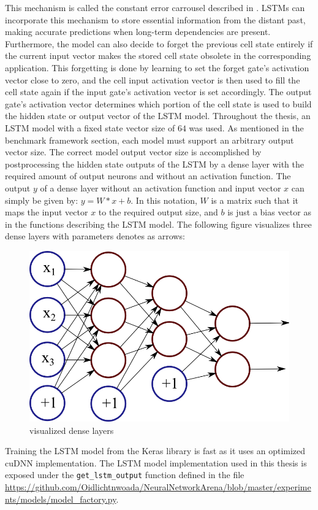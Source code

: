 \documentclass[draft,final]{vutinfth} %
\begin{document}
    This mechanism is called the constant error carrousel described in \cite[p. 7]{LSTM}.
    LSTMs can incorporate this mechanism to store essential information from the distant past, making accurate predictions when long-term dependencies are present.
    Furthermore, the model can also decide to forget the previous cell state entirely if the current input vector makes the stored cell state obsolete in the corresponding application.
    This forgetting is done by learning to set the forget gate's activation vector close to zero, and the cell input activation vector is then used to fill the cell state again if the input gate's activation vector is set accordingly.
    The output gate's activation vector determines which portion of the cell state is used to build the hidden state or output vector of the LSTM model.
    Throughout the thesis, an LSTM model with a fixed state vector size of $64$ was used. As mentioned in the benchmark framework section, each model must support an arbitrary output vector size.
    The correct model output vector size is accomplished by postprocessing the hidden state outputs of the LSTM by a dense layer with the required amount of output neurons and without an activation function.
    The output $y$ of a dense layer without an activation function and input vector $x$ can simply be given by: $y = W*x + b$.
    In this notation, $W$ is a matrix such that it maps the input vector $x$ to the required output size, and $b$ is just a bias vector as in the functions describing the LSTM model.
    The following figure visualizes three dense layers with parameters denotes as arrows:
    \begin{figure}[H]
        \centering{}
        \includegraphics[width=0.5\linewidth]{graphics/dense.png}
        \caption{visualized dense layers \cite{dense_vis}}
        \label{fig:dense_vis}
    \end{figure}
    Training the LSTM model from the Keras library is fast as it uses an optimized cuDNN \cite{cuDNN} implementation.
    The LSTM model implementation used in this thesis is exposed under the \texttt{get\_lstm\_output} function defined in the file \url{https://github.com/Oidlichtnwoada/NeuralNetworkArena/blob/master/experiments/models/model_factory.py}.
\end{document}
